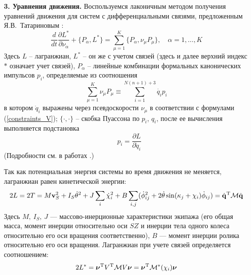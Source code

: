{\bf 3. Уравнения движения.}
Воспользуемся лаконичным методом получения уравнений движения для систем с дифференциальными связями, предложенным Я.В.~Татариновым \cite{Tatarinov}:
\begin{equation}\label{Tatarinov}
    \frac{d}{dt}\frac{\partial L^{*}}{\partial \nu_\alpha}  + \{P_\alpha, L^{*}\} = \sum\limits_{\mu = 1}^{K}\{P_\alpha, \nu_\mu P_\mu\},\quad \alpha = 1,\dots, K
\end{equation}
Здесь $L$ -- лагранжиан, $L^*$ -- он же с учетом связей (здесь и далее верхний индекс $*$ означает учет связей), $P_\alpha$ -- линейные комбинации формальных канонических импульсов $p_i$, определяемые из соотношения 
$$\sum\limits_{\mu=1}^{K}\nu_\mu P_\mu \equiv \sum\limits_{i=1}^{N(n+1)+3}\dot{q_i} p_i$$
 в котором $\dot{q}_i$ выражены через псевдоскорости $\nu_\mu$ в соответствии с формулами (\ref{constraints_V}); $\{\cdot, \cdot\}$ -- скобка Пуассона по $p_i$, $q_i$, после ее вычисления выполняется подстановка 
$$\hspace{10pt} p_i = \frac{\partial L}{\partial \dot{q}_i}$$
(Подробности см. в работах \cite{Tatarinov,Zobova2011}.)

Так как потенциальная энергия системы во время движения не меняется, лагранжиан  равен кинетической энергии:
\begin{equation}\label{kin_en}
    2L = 2T = M\boldsymbol{\mathbf{v}}_S^2 + I_S\dot{\theta}^2 + J\sum_i\dot{\chi}_i^2 + B\sum_{i,j}(\dot{\phi}_{ij}^2 + 2\dot{\theta}\sin(\kappa_j + \chi_i)\dot{\phi}_{ij})=\dot{\boldsymbol{\mathbf{q}}}^\mathrm{T}\mathcal{M}\dot{\boldsymbol{\mathbf{q}}}
\end{equation}
Здесь $M,\ I_S,\ J$ --- массово-инерционные характеристики экипажа (его общая масса, момент инерции относительно оси $SZ$ и инерции тела одного колеса относительно его оси вращения соответственно), $B$ --- момент инерции ролика относительно его оси вращения. Лагранжиан при учете связей определяется соотношением:
$$ 2L^{*}  = \boldsymbol{\mathbf{\nu}}^\mathrm{T} V^\mathrm{T}\mathcal{M} V\boldsymbol{\mathbf{\nu}} = \boldsymbol{\mathbf{\nu}}^\mathrm{T} \mathcal{M}^*(\chi_i)\boldsymbol{\mathbf{\nu}} $$

